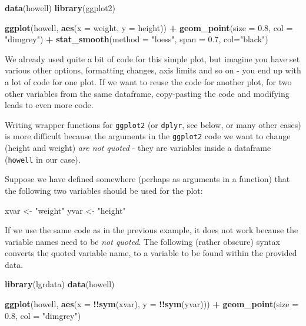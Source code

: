 \documentclass[]{book}
\newenvironment{Shaded}{\begin{snugshade}}{\end{snugshade}}
\newcommand{\DataTypeTok}[1]{\textcolor[rgb]{0.13,0.29,0.53}{#1}}
\newcommand{\FloatTok}[1]{\textcolor[rgb]{0.00,0.00,0.81}{#1}}
\newcommand{\KeywordTok}[1]{\textcolor[rgb]{0.13,0.29,0.53}{\textbf{#1}}}
\newcommand{\NormalTok}[1]{#1}
\newcommand{\OperatorTok}[1]{\textcolor[rgb]{0.81,0.36,0.00}{\textbf{#1}}}
\newcommand{\StringTok}[1]{\textcolor[rgb]{0.31,0.60,0.02}{#1}}
\begin{document}
\begin{Shaded}
\begin{Highlighting}[]
\KeywordTok{data}\NormalTok{(howell)}
\KeywordTok{library}\NormalTok{(ggplot2)}

\KeywordTok{ggplot}\NormalTok{(howell, }\KeywordTok{aes}\NormalTok{(}\DataTypeTok{x =}\NormalTok{ weight, }\DataTypeTok{y =}\NormalTok{ height)) }\OperatorTok{+}
\StringTok{  }\KeywordTok{geom_point}\NormalTok{(}\DataTypeTok{size =} \FloatTok{0.8}\NormalTok{, }\DataTypeTok{col =} \StringTok{"dimgrey"}\NormalTok{) }\OperatorTok{+}
\StringTok{  }\KeywordTok{stat_smooth}\NormalTok{(}\DataTypeTok{method =} \StringTok{"loess"}\NormalTok{, }\DataTypeTok{span =} \FloatTok{0.7}\NormalTok{, }\DataTypeTok{col=}\StringTok{"black"}\NormalTok{)}
\end{Highlighting}
\end{Shaded}

We already used quite a bit of code for this simple plot, but imagine you have set various other options, formatting changes, axis limits and so on - you end up with a lot of code for one plot. If we want to reuse the code for another plot, for two other variables from the same dataframe, copy-pasting the code and modifying leads to even more code.

Writing wrapper functions for \texttt{ggplot2} (or \texttt{dplyr}, see below, or many other cases) is more difficult because the arguments in the \texttt{ggplot2} code we want to change (height and weight) \emph{are not quoted} - they are variables inside a dataframe (\texttt{howell} in our case).

Suppose we have defined somewhere (perhaps as arguments in a function) that the following two variables should be used for the plot:

\begin{Shaded}
\begin{Highlighting}[]
\NormalTok{xvar <-}\StringTok{ "weight"}
\NormalTok{yvar <-}\StringTok{ "height"}
\end{Highlighting}
\end{Shaded}

If we use the same code as in the previous example, it does not work because the variable names need to be \emph{not quoted}. The following (rather obscure) syntax converts the quoted variable name, to a variable to be found within the provided data.

\begin{Shaded}
\begin{Highlighting}[]
\KeywordTok{library}\NormalTok{(lgrdata)}
\KeywordTok{data}\NormalTok{(howell)}

\KeywordTok{ggplot}\NormalTok{(howell, }\KeywordTok{aes}\NormalTok{(}\DataTypeTok{x =} \OperatorTok{!!}\KeywordTok{sym}\NormalTok{(xvar), }\DataTypeTok{y =} \OperatorTok{!!}\KeywordTok{sym}\NormalTok{(yvar))) }\OperatorTok{+}
\KeywordTok{geom_point}\NormalTok{(}\DataTypeTok{size =} \FloatTok{0.8}\NormalTok{, }\DataTypeTok{col =} \StringTok{"dimgrey"}\NormalTok{)}
\end{Highlighting}
\end{Shaded}
\end{document}
